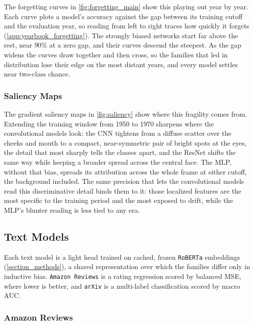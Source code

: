 The forgetting curves in \cref{fig:forgetting_main} show this playing out year by year. Each curve plots a model's accuracy against the gap between its training cutoff and the evaluation year, so reading from left to right traces how quickly it forgets (\cref{app:yearbook_forgetting}). The strongly biased networks start far above the rest, near $90\%$ at a zero gap, and their curves descend the steepest. As the gap widens the curves draw together and then cross, so the families that led in distribution lose their edge on the most distant years, and every model settles near two-class chance.

\subsubsection{Saliency Maps}

The gradient saliency maps in \cref{fig:saliency} show where this fragility comes from. Extending the training window from 1950 to 1970 sharpens where the convolutional models look: the CNN tightens from a diffuse scatter over the cheeks and mouth to a compact, near-symmetric pair of bright spots at the eyes, the detail that most sharply tells the classes apart, and the ResNet shifts the same way while keeping a broader spread across the central face. The MLP, without that bias, spreads its attribution across the whole frame at either cutoff, the background included. The same precision that lets the convolutional models read this discriminative detail binds them to it: those localized features are the most specific to the training period and the most exposed to drift, while the MLP's blunter reading is less tied to any era.

\subsection{Text Models}

Each text model is a light head trained on cached, frozen \texttt{RoBERTa} embeddings (\cref{section_methods}), a shared representation over which the families differ only in inductive bias. \texttt{Amazon Reviews} is a rating regression scored by balanced MSE, where lower is better, and \texttt{arXiv} is a multi-label classification scored by macro AUC.

\subsubsection{Amazon Reviews}

